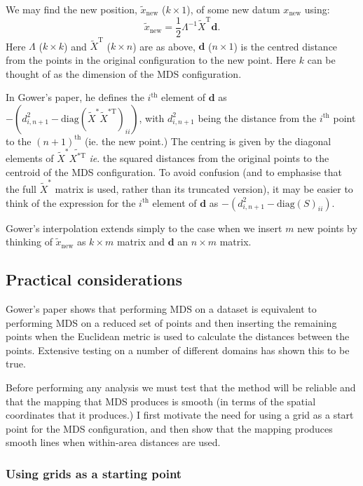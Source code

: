 \documentclass[a4paper,10pt]{article}
\newcommand{\tr}[1]{#1^{\text{T}}}
\newcommand{\cross}{\times}
\begin{document}
We may find the new position, $\tilde{x}_{\text{new}}$ ($k \cross 1$), of some new datum $x_{\text{new}}$ using:
\begin{equation}
\tilde{x}_{\text{new}} = \frac{1}{2} \Lambda^{-1} \tr{\tilde{X}} \mathbf{d}.
\label{gower}
\end{equation}
Here $\Lambda$ ($k \cross k$) and $\tr{\tilde{X}}$ ($k \cross n$) are as above, $\mathbf{d}$ ($n \cross 1$) is the centred distance from the points in the original configuration to the new point. Here $k$ can be thought of as the dimension of the MDS configuration.

In Gower's paper, he defines the $i^\text{th}$ element of $\mathbf{d}$ as $-(d^2_{i,n+1}-\text{diag}(\tilde{X}^* \tilde{X}^{*\text{T}})_{ii})$, with $d^2_{i,n+1}$ being the distance from the $i^\text{th}$ point to the $(n+1)^\text{th}$ (ie. the new point.) The centring is given by the diagonal elements of $\tilde{X}^*\tilde{X^{* \text{T}}}$ \emph{ie}. the squared distances from the original points to the centroid of the MDS configuration. To avoid confusion (and to emphasise that the full $\tilde{X}^*$ matrix is used, rather than its truncated version), it may be easier to think of the expression for the $i^\text{th}$ element of $\mathbf{d}$ as $-(d^2_{i,n+1}-\text{diag}(S)_{ii})$.

Gower's interpolation extends simply to the case when we insert $m$ new points by thinking of $\tilde{x}_{\text{new}}$ as $k \cross m$ matrix and $\mathbf{d}$ an $n \cross m$ matrix.


\subsection{Practical considerations}

Gower's paper shows that performing MDS on a dataset is equivalent to performing MDS on a reduced set of points and then inserting the remaining points when the Euclidean metric is used to calculate the distances between the points. Extensive testing on a number of different domains has shown this to be true.

Before performing any analysis we must test that the method will be reliable and that the mapping that MDS produces is smooth (in terms of the spatial coordinates that it produces.) I first motivate the need for using a grid as a start point for the MDS configuration, and then show that the mapping produces smooth lines when within-area distances are used.

\subsubsection{Using grids as a starting point}
\end{document}
